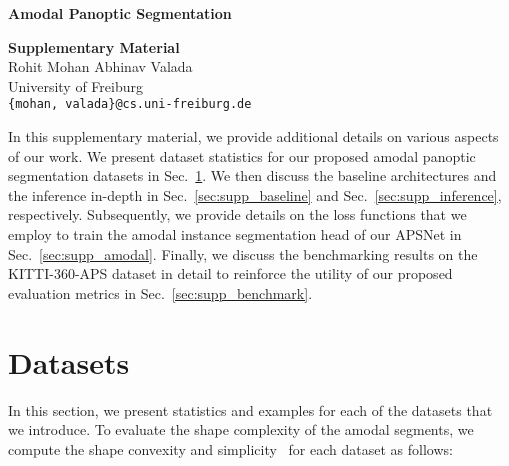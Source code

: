 \documentclass[10pt,twocolumn,letterpaper]{article}
\newcommand{\secref}[1]{Sec.~\ref{#1}}
\begin{document}
{\small


}

\flushcolsend
\pagebreak


\begin{strip}
\begin{center}


\vspace{-5ex}
\textbf{\Large \bf
Amodal Panoptic Segmentation} \\
\vspace*{12pt}

\Large{\bf Supplementary Material}\\
\vspace*{12pt}
\large{Rohit Mohan \qquad Abhinav Valada}\\
\large{University of Freiburg}\\
\vspace*{2pt}
\tt\small{\{mohan, valada\}@cs.uni-freiburg.de}

\end{center}
\end{strip}

\setcounter{section}{0}
\setcounter{equation}{0}
\setcounter{figure}{0}
\setcounter{table}{0}
\makeatletter





\normalsize

In this supplementary material, we provide additional details on various aspects of our work. We present dataset statistics for our proposed amodal panoptic segmentation datasets in \secref{sec:supp_dataset}. We then discuss the baseline architectures and the inference in-depth in \secref{sec:supp_baseline} and \secref{sec:supp_inference}, respectively. Subsequently, we provide details on the loss functions that we employ to train the amodal instance segmentation head of our APSNet in \secref{sec:supp_amodal}. Finally, we discuss the benchmarking results on the KITTI-360-APS dataset in detail to reinforce the utility of our proposed evaluation metrics in \secref{sec:supp_benchmark}.

\section{Datasets}
\label{sec:supp_dataset}

In this section, we present statistics and examples for each of the datasets that we introduce. To evaluate the shape complexity of the amodal segments, we compute the shape convexity and simplicity~\cite{zhu2017semantic} for each dataset as follows:
\end{document}
